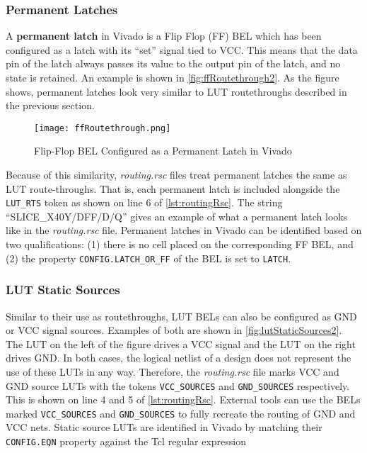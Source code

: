 \subsubsection{Permanent Latches}
A \textbf{permanent latch} in Vivado is a Flip Flop (FF) BEL which has been
configured as a latch with its ``set'' signal tied to VCC. This means that the
data pin of the latch always passes its value to the output pin of the latch,
and no state is retained. An example is shown in \autoref{fig:ffRoutethrough2}.
As the figure shows, permanent latches look very similar to LUT routethroughs
described in the previous section.

\begin{figure}[h]
  \centering
  \texttt{[image: ffRoutethrough.png]}
  \caption{Flip-Flop BEL Configured as a Permanent Latch in Vivado}
  \label{fig:ffRoutethrough2}
\end{figure}

Because of this similarity, \textit{routing.rsc} files treat permanent latches
the same as LUT route-throughs. That is, each permanent latch is included
alongside the \texttt{LUT\_RTS} token as shown on line 6 of
\autoref{lst:routingRsc}. The string ``SLICE\_X40Y/DFF/D/Q'' gives an
example of what a permanent latch looks like in the \textit{routing.rsc} file. Permanent
latches in Vivado can be identified based on two qualifications: (1) there is
no cell placed on the corresponding FF BEL, and (2) the property
\texttt{CONFIG.LATCH\_OR\_FF} of the BEL is set to \texttt{LATCH}.

\subsubsection{LUT Static Sources}
Similar to their use as routethroughs, LUT BELs can also be configured as GND or
VCC signal sources. Examples of both are shown in
\autoref{fig:lutStaticSources2}. The LUT on the left of the figure drives a VCC
signal and the LUT on the right drives GND. In both cases, the logical
netlist of a design does not represent the use of these LUTs in any way.
Therefore, the \textit{routing.rsc} file marks VCC and GND source LUTs with the
tokens \texttt{VCC\_SOURCES} and \texttt{GND\_SOURCES} respectively. This is
shown on line 4 and 5 of \autoref{lst:routingRsc}. External tools can use the
BELs marked \texttt{VCC\_SOURCES} and \texttt{GND\_SOURCES} to fully
recreate the routing of GND and VCC nets. Static source LUTs are identified
in Vivado by matching their \texttt{CONFIG.EQN} property against the Tcl regular
expression

